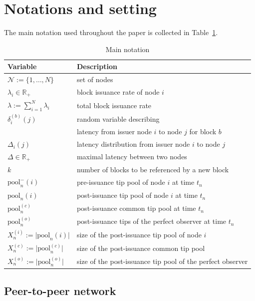 \documentclass[a4paper,12pt,oneside,reqno]{amsart}
\newcommand{\Nodes}{{\mathcal N}}
\newcommand{\block}{{b}}
\newcommand{\1}{{\mathbf 1}}
\newcommand{\pool}{\mathrm{pool}}
\newcommand{\delay}{{\delta}}
\begin{document}
\section{Notations and setting}
The main notation used throughout the paper is collected in Table~\ref{tab:notation}.
\begin{table}[t]
    \centering
    \begin{tabular}{|l|l|}
    \hline
         Variable & Description \\ \hline  \hline
        $\Nodes:=\{1,\ldots,N\}$ & set of nodes\\
        $\lambda_i\in\mathbb{R}_+$ & block issuance rate of node $i$\\ 
        $\lambda:=\sum_{i=1}^N\lambda_i$ & total block issuance rate\\
$\delay_{i}^{(\block)}(j)$& random variable describing \\
& latency from issuer node $i$ to node $j$ for block $\block$\\
$\Delta_i(j)$ & latency distribution from issuer node $i$ to node $j$\\ 
$\Delta\in \mathbb{R}_+$ &  maximal latency between two nodes  \\ 
\hline
$k$  & number of blocks to be referenced by a new block \\ 
\hline
$\pool_n^{-}(i)$ & pre-issuance tip pool of node $i$ at time $t_n$\\
$\pool_n(i)$ & post-issuance tip pool of node $i$ at time $t_n$\\
$\pool_n^{(c)}$ & post-issuance common tip pool at time $t_n$\\
$\pool_n^{(o)}  $ & post-issuance tips of the perfect observer at time $t_n$\\
$X_n^{(i)}:=\lvert \pool_n(i) \rvert$ & size of the post-issuance tip pool of node $i$\\
$X_n^{(c)}:= \lvert\pool_n^{(c)}\rvert$ & size of the post-issuance common tip pool\\
$X_n^{(o)}:= \lvert \pool_n^{(o)}\rvert $ & size of the post-issuance tip pool of the perfect observer\\
\hline
    \end{tabular}
    \caption{Main notation}
    \label{tab:notation}
\end{table}

\subsection{Peer-to-peer network}
\end{document}
